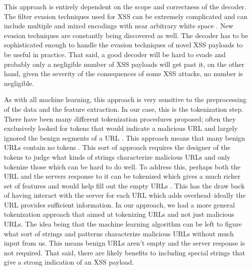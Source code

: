 This approach is entirely dependent on the scope and correctness of the decoder. The filter evasion techniques used for XSS can be extremely complicated and can include multiple and mixed encodings with near arbitrary white space \cite{xsscheat}. New evasion techniques are constantly being discovered as well. The decoder has to be sophisticated enough to handle the evasion techniques of novel XSS payloads to be useful in practice. That said, a good decoder will be hard to evade and probably only a negligible number of XSS payloads will get past it, on the other hand, given the severity of the consequences of some XSS attacks, no number is negligible. 

As with all machine learning, this approach is very sensitive to the preprocessing of the data and the feature extraction. In our case, this is the tokenization step. There have been many different tokenization procedures proposed; often they exclusively looked for tokens that would indicate a malicious URL and largely ignored the benign segments of a URL \cite{fang2018deepxss}\cite{mokbal2019mlpxss}. This approach means that many benign URLs contain no tokens \cite{zhang2019cross}. This sort of approach requires the designer of the tokens to judge what kinds of strings characterize malicious URLs and only tokenize those which can be hard to do well. To address this, perhaps both the URL and the servers response to it can be tokenized which gives a much richer set of features and would help fill out the empty URLs \cite{zhang2019cross}. This has the draw back of having interact with the server for each URL which adds overhead--ideally the URL provides sufficient information. In our approach, we had a more general tokenization approach that aimed at tokenizing URLs and not just malicious URLs. The idea being that the machine learning algorithm can be left to figure what sort of strings and patterns characterize malicious URLs without much input from us. This means benign URLs aren't empty and the server response is not required. That said, there are likely benefits to including special strings that give a strong indication of an XSS payload. 